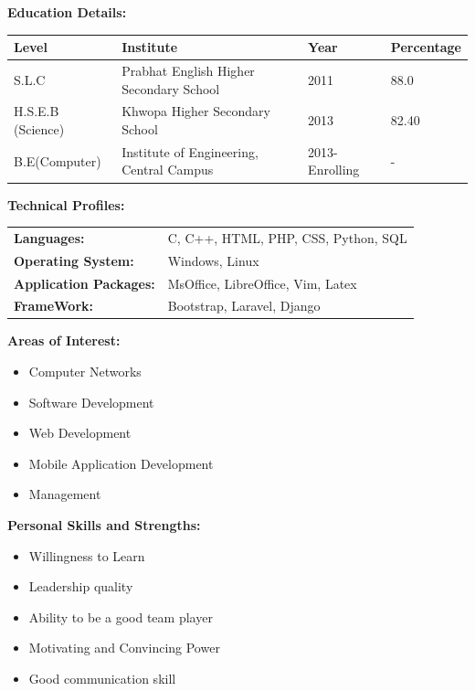 \documentclass[a4paper, 12pt]{article}
\begin{document}
\vspace{8mm}
{\Large \textbf{ Education Details: } \\
}
\begin{tabular}{l l l l}
	\textbf{Level} & \textbf{Institute} &\textbf{Year} & \textbf{Percentage} \\ \hline
	S.L.C & Prabhat English Higher Secondary School & 2011 & 88.0 \\ \hline
	H.S.E.B (Science) & Khwopa Higher Secondary School & 2013 & 82.40 \\ \hline
	B.E(Computer) & Institute of Engineering, Central Campus & 2013-Enrolling & - \\ \hline
\end{tabular}

\vspace{8mm}
{\Large \textbf{ Technical Profiles: } \\
}
\begin{tabular}{l l}
	\textbf{Languages:} & C, C++, HTML, PHP, CSS, Python, SQL \\
	\textbf{Operating System:} & Windows, Linux \\
	\textbf{Application Packages:} & MsOffice, LibreOffice, Vim, Latex \\ 
	\textbf{FrameWork: } & Bootstrap, Laravel, Django \\
	
\end{tabular}

\vspace{8mm}
{\Large \textbf{Areas of Interest:} \\
}
\vspace{-5mm}
\begin{itemize}[noitemsep]
\addtolength{\leftskip}{8mm}	
	\item Computer Networks
	\item Software Development
	\item Web Development
	\item Mobile Application Development
	\item Management

\end{itemize}

\vspace{8mm}
{\Large \textbf{Personal Skills and Strengths:}\\
}
\vspace{-5mm}
\begin{itemize}[noitemsep]
\addtolength{\leftskip}{8mm}
	\item Willingness to Learn
	\item Leadership quality
	\item Ability to be a good team player
	\item Motivating and Convincing Power
	\item Good communication skill
\end{itemize}
\end{document}
